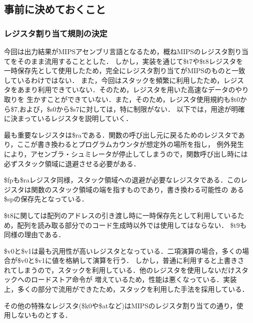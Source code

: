 \documentclass[a4paper,11pt]{jarticle}
\begin{document}
{\subsection{事前に決めておくこと}
\subsubsection{レジスタ割り当て規則の決定}
今回は出力結果がMIPSアセンブリ言語となるため，概ねMIPSのレジスタ割り当てをそのまま流用することとした．
しかし，実装を通じて\$t7や\$t8レジスタを一時保存先として使用したため，完全にレジスタ割り当てがMIPSのものと一致しているわけではない．
また，今回はスタックを頻繁に利用したため，レジスタをあまり利用できていない．そのため，レジスタを用いた高速なデータのやり取りを
生かすことができていない．また，そのため，レジスタ使用規約も\$t0から\$7,および，\$s0から\$s7に対しては，特に制限がない．
以下では，用途が明確に決まっているレジスタを説明していく．

最も重要なレジスタは\$raである．関数の呼び出し元に戻るためのレジスタであり，ここが書き換わるとプログラムカウンタが想定外の場所を指し，
例外発生により，アセンブラ・シュミレータが停止してしまうので，関数呼び出し時には必ずスタック領域に退避させる必要がある．

\$fpも\$raレジスタ同様，スタック領域への退避が必要なレジスタである．このレジスタは関数のスタック領域の端を指すものであり，書き換わる可能性の
ある\$spの保存先となっている．

\$t8に関しては配列のアドレスの引き渡し時に一時保存先として利用しているため，配列を読み取る部分でのコード生成時以外では使用してはならない．
\$t9も同様の理由である．

\$v0と\$v1は最も汎用性が高いレジスタとなっている．二項演算の場合，多くの場合が\$v0と\$v1に値を格納して演算を行う．
しかし，普通に利用すると上書きされてしまうので，スタックを利用している．他のレジスタを使用しないだけスタックへのロードストア命令が
増えているため，性能は悪くなっている．実装上，多くの部分で流用ができたため，スタックを利用した手法を採用している．

その他の特殊なレジスタ(\$k0や\$atなど)はMIPSのレジスタ割り当ての通り，使用しないものとする．


}
\end{document}
